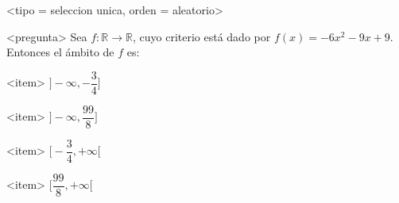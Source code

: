 <tipo = seleccion unica, orden = aleatorio>

<pregunta>
Sea $f:\mathbb R \to \mathbb R$, cuyo criterio est\'a dado por $f(x) = -6x^2 -9x +9$. Entonces el \'ambito de $f$ es:


<item>
$\bigg]{-}\infty, -\dfrac{3}{4}\bigg]$

<item>
$\bigg]{-}\infty, \dfrac{99}{8}\bigg]$

<item>
$\bigg[-\dfrac{3}{4}, +\infty\bigg[$

<item>
$\bigg[\dfrac{99}{8}, +\infty\bigg[$



